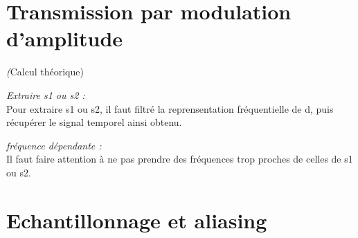 \documentclass[10pt,a4paper]{article}
\begin{document}
\section{Transmission par modulation d'amplitude}
\textit(Calcul théorique)

\textit{Extraire s1 ou s2 : }\\
Pour extraire s1 ou s2, il faut filtré la reprensentation fréquentielle de d, puis récupérer le signal temporel ainsi obtenu.

\textit{fréquence dépendante : }\\
Il faut faire attention à ne pas prendre des fréquences trop proches de celles de s1 ou s2.



\section{Echantillonnage et aliasing	}
\end{document}
